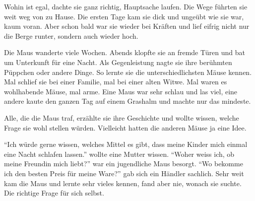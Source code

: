 Wohin ist egal, dachte sie ganz richtig, Hauptsache laufen. Die Wege führten sie weit weg von zu Hause. Die ersten Tage kam sie dick und ungeübt wie sie war, kaum voran. Aber schon bald war sie wieder bei Kräften und lief eifrig nicht nur die Berge runter, sondern auch wieder hoch.

Die Maus wanderte viele Wochen. Abends klopfte sie an fremde Türen und bat um Unterkunft für eine Nacht. Als Gegenleistung nagte sie ihre berühmten Püppchen oder andere Dinge. So lernte sie die unterschiedlichsten Mäuse kennen. Mal schlief sie bei einer Familie, mal bei einer alten Witwe. Mal waren es wohlhabende Mäuse, mal arme. Eine Maus war sehr schlau und las viel, eine andere kaute den ganzen Tag auf einem Grashalm und machte nur das mindeste.

Alle, die die Maus traf, erzählte sie ihre Geschichte und wollte wissen, welche Frage sie wohl stellen würden. Vielleicht hatten die anderen Mäuse ja eine Idee.

\enquote{Ich würde gerne wissen, welches Mittel es gibt, dass meine Kinder mich einmal eine Nacht schlafen lassen.} wollte eine Mutter wissen. \enquote{Woher weiss ich, ob meine Freundin mich liebt?} war ein jugendliche Maus besorgt. \enquote{Wo bekomme ich den besten Preis für meine Ware?} gab sich ein Händler sachlich. Sehr weit kam die Maus und lernte sehr vieles kennen, fand aber nie, wonach sie suchte. Die richtige Frage für sich selbst.


